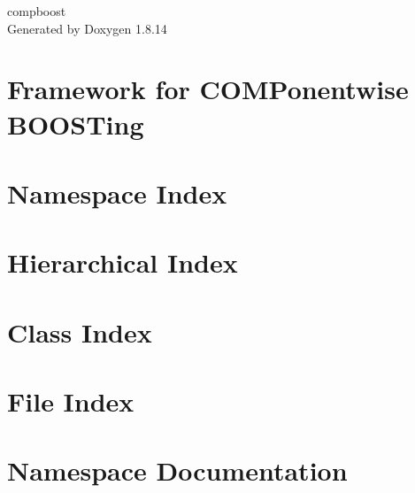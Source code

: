 \documentclass[twoside]{book}
\newcommand{\+}{\discretionary{\mbox{\scriptsize$\hookleftarrow$}}{}{}}
\newcommand{\clearemptydoublepage}{%
  \newpage{\pagestyle{empty}\cleardoublepage}%
}
\begin{document}
\hypersetup{pageanchor=false,
             bookmarksnumbered=true,
             pdfencoding=unicode
            }
\begin{titlepage}
\vspace*{7cm}
\begin{center}%
{\Large compboost }\\
\vspace*{1cm}
{\large Generated by Doxygen 1.8.14}\\
\end{center}
\end{titlepage}
\clearemptydoublepage
{}
\tableofcontents
\clearemptydoublepage
{}
\hypersetup{pageanchor=true}

\chapter{Framework for C\+O\+M\+Ponentwise B\+O\+O\+S\+Ting}
\label{index}\hypertarget{index}{}
\chapter{Namespace Index}

\chapter{Hierarchical Index}

\chapter{Class Index}

\chapter{File Index}

\chapter{Namespace Documentation}










\end{document}
